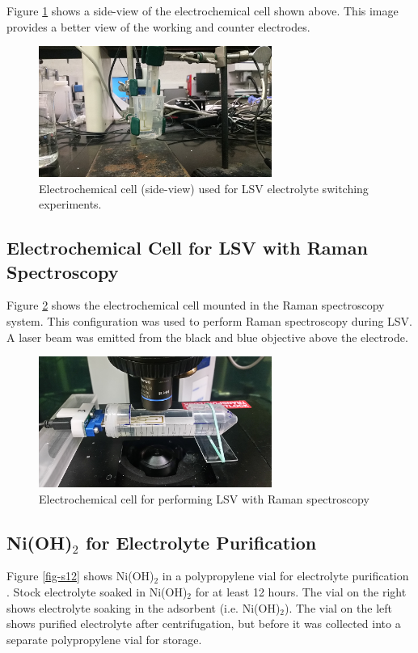 \documentclass[journal=jpccck,manuscript=suppinfo,email=true]{achemso}
\begin{document}
Figure \ref{fig-s10} shows a side-view of the electrochemical cell shown above. This image provides a better view of the working and counter electrodes.
\begin{figure}[h]
\centering
\includegraphics[width=3in]{./images/apparatus/ecell-bench-2.png}
\caption{\label{fig-s10}Electrochemical cell (side-view) used for LSV electrolyte switching experiments.}
\end{figure}
\subsection{Electrochemical Cell for LSV with Raman Spectroscopy}
\label{sec-5-3}
Figure \ref{fig-s11} shows the electrochemical cell mounted in the Raman spectroscopy system. This configuration was used to perform Raman spectroscopy during LSV. A laser beam was emitted from the black and blue objective above the electrode.
\begin{figure}[h]
\centering
\includegraphics[width=3in]{./images/apparatus/ecell-raman.png}
\caption{\label{fig-s11}Electrochemical cell for performing LSV with Raman spectroscopy}
\end{figure}

\subsection{Ni(OH)$_{\text{2}}$ for Electrolyte Purification}
\label{sec-5-4}
Figure \ref{fig-s12} shows Ni(OH)$_{\text{2}}$ in a polypropylene vial for electrolyte purification \cite{trotochaud-2014-nickel-iron}. Stock electrolyte soaked in Ni(OH)$_{\text{2}}$ for at least 12 hours. The vial on the right shows electrolyte soaking in the adsorbent (i.e. Ni(OH)$_{\text{2}}$). The vial on the left shows purified electrolyte after centrifugation, but before it was collected into a separate polypropylene vial for storage.
\end{document}
